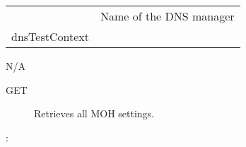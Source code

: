 \documentclass[letterpaper,10pt,english]{sphinxmanual}
\begin{document}
\begin{savenotes}\sphinxattablestart
\centering
\begin{tabulary}{\linewidth}[t]{|T|T|}
\hline

&
\\
\hline
{}
&
Name of the DNS manager
\\
\hline
dnsTestContext
&\\
\hline
\end{tabulary}
\par
\sphinxattableend\end{savenotes}

 N/A
\begin{description}
\item[{ GET}] \leavevmode
Retrieves all MOH settings.

\end{description}

:
\end{document}
